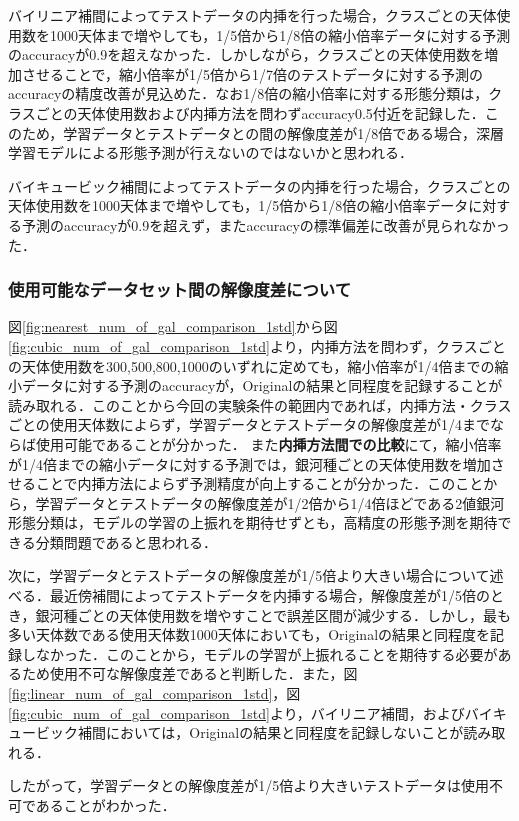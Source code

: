 \documentclass[a4j, 11pt]{jreport}
\begin{document}
バイリニア補間によってテストデータの内挿を行った場合，クラスごとの天体使用数を1000天体まで増やしても，1/5倍から1/8倍の縮小倍率データに対する予測のaccuracyが0.9を超えなかった．しかしながら，クラスごとの天体使用数を増加させることで，縮小倍率が1/5倍から1/7倍のテストデータに対する予測のaccuracyの精度改善が見込めた．なお1/8倍の縮小倍率に対する形態分類は，クラスごとの天体使用数および内挿方法を問わずaccuracy0.5付近を記録した．このため，学習データとテストデータとの間の解像度差が1/8倍である場合，深層学習モデルによる形態予測が行えないのではないかと思われる．

バイキュービック補間によってテストデータの内挿を行った場合，クラスごとの天体使用数を1000天体まで増やしても，1/5倍から1/8倍の縮小倍率データに対する予測のaccuracyが0.9を超えず，またaccuracyの標準偏差に改善が見られなかった．

\subsubsection{使用可能なデータセット間の解像度差について}
図\ref{fig:nearest_num_of_gal_comparison_1std}から図\ref{fig:cubic_num_of_gal_comparison_1std}より，内挿方法を問わず，クラスごとの天体使用数を300,500,800,1000のいずれに定めても，縮小倍率が1/4倍までの縮小データに対する予測のaccuracyが，Originalの結果と同程度を記録することが読み取れる．このことから今回の実験条件の範囲内であれば，内挿方法・クラスごとの使用天体数によらず，学習データとテストデータの解像度差が1/4までならば使用可能であることが分かった．
また\textbf{内挿方法間での比較}にて，縮小倍率が1/4倍までの縮小データに対する予測では，銀河種ごとの天体使用数を増加させることで内挿方法によらず予測精度が向上することが分かった．このことから，学習データとテストデータの解像度差が1/2倍から1/4倍ほどである2値銀河形態分類は，モデルの学習の上振れを期待せずとも，高精度の形態予測を期待できる分類問題であると思われる．

次に，学習データとテストデータの解像度差が1/5倍より大きい場合について述べる．最近傍補間によってテストデータを内挿する場合，解像度差が1/5倍のとき，銀河種ごとの天体使用数を増やすことで誤差区間が減少する．しかし，最も多い天体数である使用天体数1000天体においても，Originalの結果と同程度を記録しなかった．このことから，モデルの学習が上振れることを期待する必要があるため使用不可な解像度差であると判断した．また，図\ref{fig:linear_num_of_gal_comparison_1std}，図\ref{fig:cubic_num_of_gal_comparison_1std}より，バイリニア補間，およびバイキュービック補間においては，Originalの結果と同程度を記録しないことが読み取れる．

したがって，学習データとの解像度差が1/5倍より大きいテストデータは使用不可であることがわかった．
\end{document}
